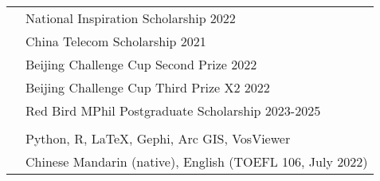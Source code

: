 \documentclass[letterpaper, 11pt]{article}
\begin{document}
\begin{longtable}{p{1.3in}p{4.8in}}


{\color{RoyalBlue}{Selected Honors }} 
&  National Inspiration Scholarship  \hfill 2022\\
{\color{RoyalBlue}{and Scholarships}} 
& China Telecom Scholarship \hfill 2021 \\
& Beijing Challenge Cup Second Prize \hfill 2022 \\
& Beijing Challenge Cup Third Prize X2 \hfill 2022 \\
& Red Bird MPhil Postgraduate Scholarship \hfill 2023-2025 \\
& \\


{\color{RoyalBlue}{Skills and Software}} 
&Python, R, LaTeX, Gephi, Arc GIS, VosViewer\\

{\color{RoyalBlue}{Languages}} 
&Chinese Mandarin (native), English (TOEFL 106, July 2022) \\








\end{longtable}
\end{document}
